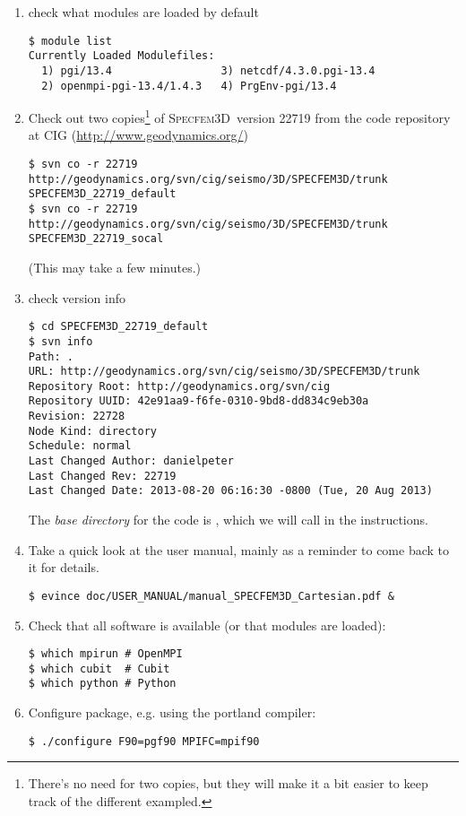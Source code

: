 \documentclass[10pt,fleqn,letterpaper]{article}
\newcommand{\specfem}{\textsc{Specfem3D}}
\begin{document}
\begin{enumerate}
\item check what modules are loaded by default
\begin{lstlisting}
$ module list
Currently Loaded Modulefiles:
  1) pgi/13.4                 3) netcdf/4.3.0.pgi-13.4
  2) openmpi-pgi-13.4/1.4.3   4) PrgEnv-pgi/13.4
\end{lstlisting}

\item Check out two copies\footnote{There's no need for two copies, but they will make it a bit easier to keep track of the different exampled.} of \specfem\ version 22719 from the code repository at CIG (\url{http://www.geodynamics.org/})
%
\begin{lstlisting}
$ svn co -r 22719 http://geodynamics.org/svn/cig/seismo/3D/SPECFEM3D/trunk SPECFEM3D_22719_default
$ svn co -r 22719 http://geodynamics.org/svn/cig/seismo/3D/SPECFEM3D/trunk SPECFEM3D_22719_socal
\end{lstlisting}
%
(This may take a few minutes.)

\item check version info
%
\begin{lstlisting}
$ cd SPECFEM3D_22719_default
$ svn info
Path: .
URL: http://geodynamics.org/svn/cig/seismo/3D/SPECFEM3D/trunk
Repository Root: http://geodynamics.org/svn/cig
Repository UUID: 42e91aa9-f6fe-0310-9bd8-dd834c9eb30a
Revision: 22728
Node Kind: directory
Schedule: normal
Last Changed Author: danielpeter
Last Changed Rev: 22719
Last Changed Date: 2013-08-20 06:16:30 -0800 (Tue, 20 Aug 2013)
\end{lstlisting}

The {\em base directory} for the code is , which we will call  in the instructions.

\item Take a quick look at the user manual, mainly as a reminder to come back to it for details. 
%
\begin{lstlisting}
$ evince doc/USER_MANUAL/manual_SPECFEM3D_Cartesian.pdf &
\end{lstlisting}

\item Check that all software is available (or that modules are loaded):
\begin{lstlisting}
$ which mpirun # OpenMPI
$ which cubit  # Cubit
$ which python # Python
\end{lstlisting}

\item Configure package, e.g. using the portland compiler:
\begin{lstlisting}
$ ./configure F90=pgf90 MPIFC=mpif90
\end{lstlisting}


\end{enumerate}
\end{document}
